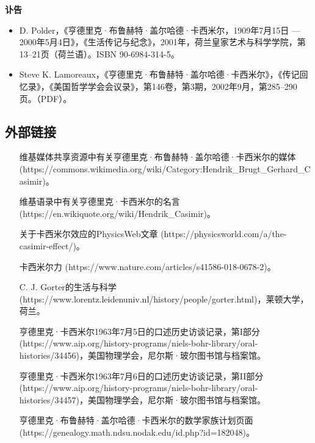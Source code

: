 \textbf{讣告}

\begin{itemize}
\item D. Polder，《亨德里克·布鲁赫特·盖尔哈德·卡西米尔，1909年7月15日 — 2000年5月4日》，《生活传记与纪念》，2001年，荷兰皇家艺术与科学学院，第13–21页（荷兰语）。ISBN 90-6984-314-5。
\item Steve K. Lamoreaux，《亨德里克·布鲁赫特·盖尔哈德·卡西米尔》，《传记回忆录》，《美国哲学学会会议录》，第146卷，第3期，2002年9月，第285–290页。（PDF）。
\end{itemize}
\subsection{外部链接}
\begin{itemize}
\item [维基媒体共享资源中有关亨德里克·布鲁赫特·盖尔哈德·卡西米尔的媒体](https://commons.wikimedia.org/wiki/Category:Hendrik_Brugt_Gerhard_Casimir)。
\item [维基语录中有关亨德里克·卡西米尔的名言](https://en.wikiquote.org/wiki/Hendrik_Casimir)。
\item [关于卡西米尔效应的PhysicsWeb文章](https://physicsworld.com/a/the-casimir-effect/)。
\item [卡西米尔力](https://www.nature.com/articles/s41586-018-0678-2)。
\item [C. J. Gorter的生活与科学](https://www.lorentz.leidenuniv.nl/history/people/gorter.html)，莱顿大学，荷兰。
\item [亨德里克·卡西米尔1963年7月5日的口述历史访谈记录，第I部分](https://www.aip.org/history-programs/niels-bohr-library/oral-histories/34456)，美国物理学会，尼尔斯·玻尔图书馆与档案馆。
\item [亨德里克·卡西米尔1963年7月6日的口述历史访谈记录，第II部分](https://www.aip.org/history-programs/niels-bohr-library/oral-histories/34457)，美国物理学会，尼尔斯·玻尔图书馆与档案馆。
\item [亨德里克·布鲁赫特·盖尔哈德·卡西米尔的数学家族计划页面](https://genealogy.math.ndsu.nodak.edu/id.php?id=182048)。
\end{itemize}